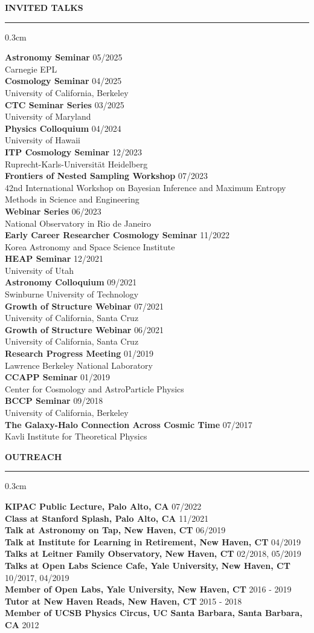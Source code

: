 \documentclass[12pt]{article}
\renewenvironment{section}[1]
  {
  \medskip
  {\color{aublue} \MakeUppercase{\bf #1}}
  \smallskip
  \hrule
  \medskip
  \begin{adjustwidth}{0.3cm}{}
  }
  {
  \end{adjustwidth}
  }
\newcommand{\entry}[3]{{\bf #1} \hfill {#2} \\ {#3}}
\begin{document}
\begin{section}{Invited Talks}
  \entry{Astronomy Seminar}{05/2025}{Carnegie EPL} \\
  \entry{Cosmology Seminar}{04/2025}{University of California, Berkeley} \\
  \entry{CTC Seminar Series}{03/2025}{University of Maryland} \\
  \entry{Physics Colloquium}{04/2024}{University of Hawaii} \\
  \entry{ITP Cosmology Seminar}{12/2023}{Ruprecht-Karls-Universität Heidelberg} \\
  \entry{Frontiers of Nested Sampling Workshop}{07/2023}{42nd  International Workshop on Bayesian Inference and Maximum Entropy Methods in Science and Engineering} \\
  \entry{Webinar Series}{06/2023}{National Observatory in Rio de Janeiro} \\
  \entry{Early Career Researcher Cosmology Seminar}{11/2022}{Korea Astronomy and Space Science Institute} \\
  \entry{HEAP Seminar}{12/2021}{University of Utah} \\
  \entry{Astronomy Colloquium}{09/2021}{Swinburne University of Technology} \\
  \entry{Growth of Structure Webinar}{07/2021}{University of California, Santa Cruz} \\
  \entry{Growth of Structure Webinar}{06/2021}{University of California, Santa Cruz} \\
  \entry{Research Progress Meeting}{01/2019}{Lawrence Berkeley National Laboratory} \\
  \entry{CCAPP Seminar}{01/2019}{Center for Cosmology and AstroParticle Physics} \\
  \entry{BCCP Seminar}{09/2018}{University of California, Berkeley} \\
  \entry{The Galaxy-Halo Connection Across Cosmic Time}{07/2017}{Kavli Institute for Theoretical Physics}
\end{section}

\begin{section}{Outreach}
  \entry{KIPAC Public Lecture, Palo Alto, CA}{07/2022}{}
  \entry{Class at Stanford Splash, Palo Alto, CA}{11/2021}{}
  \entry{Talk at Astronomy on Tap, New Haven, CT}{06/2019}{}
  \entry{Talk at Institute for Learning in Retirement, New Haven, CT}{04/2019}{}
  \entry{Talks at Leitner Family Observatory, New Haven, CT}{02/2018, 05/2019}{}
  \entry{Talks at Open Labs Science Cafe, Yale University, New Haven, CT}{10/2017,  04/2019}{}
  \entry{Member of Open Labs, Yale University, New Haven, CT}{2016 - 2019}{}
  \entry{Tutor at New Haven Reads, New Haven, CT}{2015 - 2018}{}
  \entry{Member of UCSB Physics Circus, UC Santa Barbara, Santa Barbara, CA}{2012}{}
\end{section}
\end{document}
